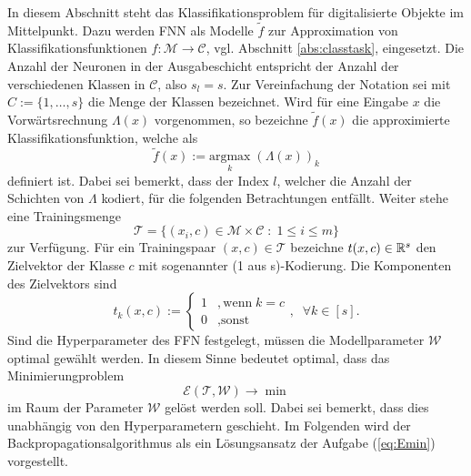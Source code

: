 In diesem Abschnitt steht das Klassifikationsproblem für digitalisierte Objekte im Mittelpunkt. Dazu werden FNN als Modelle $\tilde{f}$ zur Approximation von Klassifikationsfunktionen $f: \mathcal{M} \rightarrow \mathcal{C}$, vgl. Abschnitt \ref{abs:classtask}, eingesetzt. Die Anzahl der Neuronen in der Ausgabeschicht entspricht der Anzahl der verschiedenen Klassen in $\mathcal{C}$, also $s_l=s$. Zur Vereinfachung der Notation sei mit $C:=\{1, \ldots, s\}$ die Menge der Klassen bezeichnet. Wird für eine Eingabe $x$ die Vorwärtsrechnung $\Lambda(x)$ vorgenommen, so bezeichne $\tilde{f}(x)$ die approximierte Klassifikationsfunktion, welche als
\begin{equation*}
    \tilde{f}(x):= \underset{k}{\mathrm{argmax}} \; \left(\Lambda(x)\right)_k
\end{equation*}
definiert ist. Dabei sei bemerkt, dass der Index $l$, welcher die Anzahl der Schichten von $\Lambda$ kodiert, für die folgenden Betrachtungen entfällt.   
Weiter stehe eine Trainingsmenge 
\begin{equation*}
    \mathcal{T}= \{(x_i, c) \in \mathcal{M} \times \mathcal{C}\; : \; 1 \leq i \leq m\}  
\end{equation*}
zur Verfügung. Für ein Trainingspaar $\left(x,c\right) \in \mathcal{T}$ bezeichne $t(x,c) \in \mathbb{R}^s$ den Zielvektor der Klasse $c$ mit sogenannter (1 aus s)-Kodierung. Die Komponenten des Zielvektors sind
\begin{equation*}
    t_k(x,c):= \begin{cases}
        1 &, \text{wenn} \; k=c \\
        0 &, \text{sonst}
    \end{cases}, \; \; \forall k \in [s].
\end{equation*} 
Sind die Hyperparameter des FFN festgelegt, müssen die Modellparameter $\mathcal{W}$ optimal gewählt werden. In diesem Sinne bedeutet optimal, dass das Minimierungproblem 
\begin{equation}
    \label{eq:Emin}
    \mathcal{E}(\mathcal{T}, \mathcal{W}) \rightarrow \min
\end{equation} 
im Raum der Parameter $\mathcal{W}$ gelöst werden soll. Dabei sei bemerkt, dass dies unabhängig von den Hyperparametern geschieht. Im Folgenden wird der Backpropagationsalgorithmus als ein Lösungsansatz der Aufgabe (\ref{eq:Emin}) vorgestellt.  

